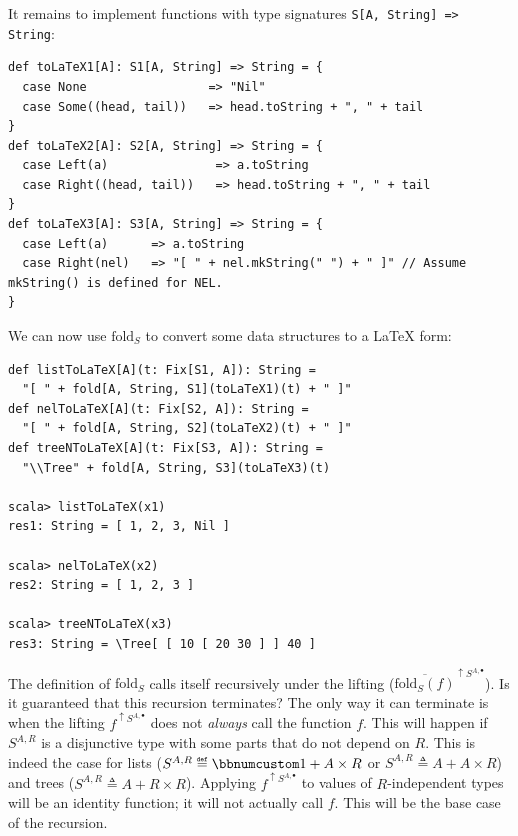 It remains to implement functions with type signatures \lstinline!S[A, String] => String!:
\begin{lstlisting}
def toLaTeX1[A]: S1[A, String] => String = {
  case None                 => "Nil"
  case Some((head, tail))   => head.toString + ", " + tail
}
def toLaTeX2[A]: S2[A, String] => String = {
  case Left(a)               => a.toString
  case Right((head, tail))   => head.toString + ", " + tail
}
def toLaTeX3[A]: S3[A, String] => String = {
  case Left(a)      => a.toString
  case Right(nel)   => "[ " + nel.mkString(" ") + " ]" // Assume mkString() is defined for NEL.
}
\end{lstlisting}
We can now use $\text{fold}_{S}$ to convert some data structures
to a \LaTeX{} form:
\begin{lstlisting}
def listToLaTeX[A](t: Fix[S1, A]): String =
  "[ " + fold[A, String, S1](toLaTeX1)(t) + " ]"
def nelToLaTeX[A](t: Fix[S2, A]): String =
  "[ " + fold[A, String, S2](toLaTeX2)(t) + " ]"
def treeNToLaTeX[A](t: Fix[S3, A]): String =
  "\\Tree" + fold[A, String, S3](toLaTeX3)(t)

scala> listToLaTeX(x1)
res1: String = [ 1, 2, 3, Nil ]

scala> nelToLaTeX(x2)
res2: String = [ 1, 2, 3 ]

scala> treeNToLaTeX(x3)
res3: String = \Tree[ [ 10 [ 20 30 ] ] 40 ]
\end{lstlisting}

The definition of $\text{fold}_{S}$ calls itself recursively under
the lifting ($\overline{\text{fold}_{S}(f)}^{\uparrow S^{A,\bullet}}$).
Is it guaranteed that this recursion terminates? The only way it can
terminate is when the lifting $f^{\uparrow S^{A,\bullet}}$ does not
\emph{always} call the function $f$. This will happen if $S^{A,R}$
is a disjunctive type with some parts that do not depend on $R$.
This is indeed the case for lists ($S^{A,R}\triangleq\bbnum 1+A\times R$
or $S^{A,R}\triangleq A+A\times R$) and trees ($S^{A,R}\triangleq A+R\times R$).
Applying $f^{\uparrow S^{A,\bullet}}$ to values of $R$-independent
types will be an identity function; it will not actually call $f$.
This will be the base case of the recursion.

